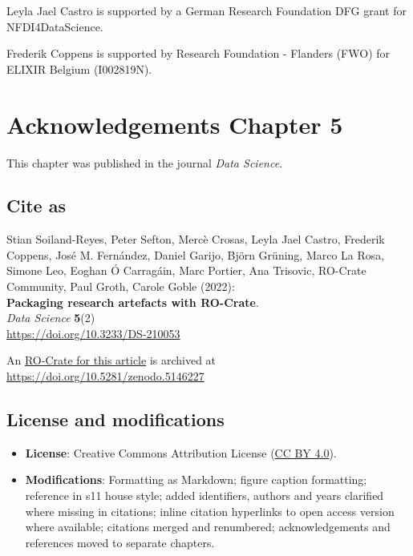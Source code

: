 Leyla Jael Castro is supported by a German Research Foundation DFG grant
for NFDI4DataScience.

Frederik Coppens is supported by Research Foundation - Flanders (FWO)
for ELIXIR Belgium (I002819N).



\section{Acknowledgements Chapter 5}

This chapter was published in the journal \emph{Data Science}.

\subsection*{Cite as}

Stian Soiland-Reyes, Peter Sefton, Mercè Crosas, Leyla Jael Castro,
Frederik Coppens, José M. Fernández, Daniel Garijo, Björn Grüning, Marco
La Rosa, Simone Leo, Eoghan Ó Carragáin, Marc Portier, Ana Trisovic,
RO-Crate Community, Paul Groth, Carole Goble (2022):\\
\textbf{Packaging research artefacts with RO-Crate}.\\
\emph{Data Science} \textbf{5}(2)\\
\url{https://doi.org/10.3233/DS-210053}

An \href{https://w3id.org/ro/doi/10.5281/zenodo.5146227}{RO-Crate for
this article} is archived at
\url{https://doi.org/10.5281/zenodo.5146227}

\subsection*{License and modifications}

\begin{itemize}
\tightlist
\item
  \textbf{License}: Creative Commons Attribution License
  (\href{https://spdx.org/licenses/CC-BY-4.0}{CC BY 4.0}).
\item
  \textbf{Modifications}: Formatting as Markdown; figure caption
  formatting; reference in s11 house style; added identifiers, authors
  and years clarified where missing in citations; inline citation
  hyperlinks to open access version where available; citations merged and renumbered; 
  acknowledgements and references moved to separate chapters.
\end{itemize}


